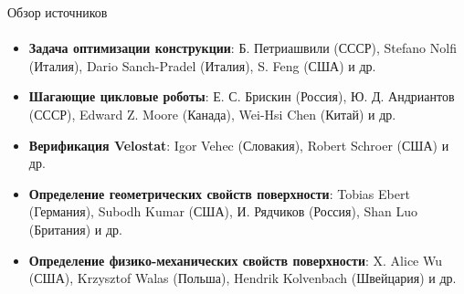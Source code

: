 \begin{frame}[t]{Обзор источников}
    \framesubtitle{}
    \begin{itemize}
        \item \textbf{Задача оптимизации конструкции}: Б. Петриашвили (СССР), Stefano Nolfi (Италия), Dario Sanch-Pradel (Италия), S. Feng (США) и др.
        \item \textbf{Шагающие цикловые роботы}: Е. С. Брискин (Россия), Ю. Д. Андриантов (СССР), Edward Z. Moore (Канада), Wei-Hsi Chen (Китай) и др.
        \item \textbf{Верификация Velostat}:  Igor Vehec (Словакия),  Robert Schroer (США) и др.
        \item \textbf{Определение геометрических свойств поверхности}: Tobias Ebert (Германия), Subodh Kumar (США), И. Рядчиков (Россия), Shan Luo (Британия) и др.
        \item \textbf{Определение физико-механических свойств поверхности}: X. Alice Wu (США), Krzysztof Walas (Польша), Hendrik Kolvenbach (Швейцария) и др.
    \end{itemize}
\end{frame}

